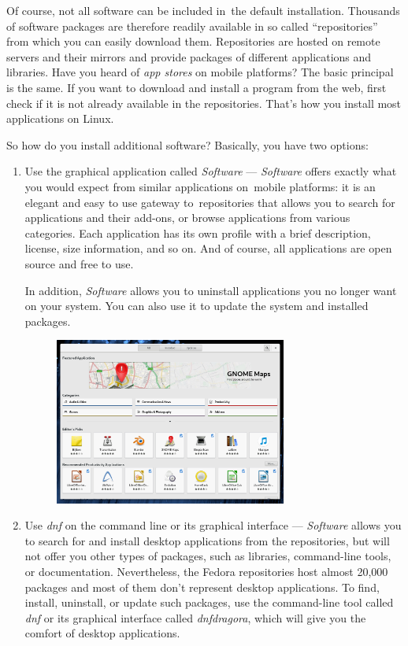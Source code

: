 Of course, not all software can be included in~the default installation. Thousands of software packages are therefore readily available in so called \enquote{repositories} from which you can easily download them. Repositories are hosted on remote servers and their mirrors and provide packages of different applications and libraries. Have you heard of \emph{app stores} on mobile platforms? The basic principal is the same. If you want to download and install a program from the web, first check if it is not already available in the repositories. That's how you install most applications on Linux.


So how do you install additional software? Basically, you have two options:
\begin{enumerate}
\item Use the graphical application called \emph{Software} --- \emph{Software} offers exactly what you would expect from similar applications on~mobile platforms: it is an elegant and easy to use gateway to~repositories that allows you to search for applications and their add-ons, or browse applications from various categories. Each application has its own profile with a brief description, license, size information, and so on. And of course, all applications are open source and free to use.

In addition, \emph{Software} allows you to uninstall applications you no longer want on your system. You can also use it to update the system and installed packages.

\begin{figure}[htbp]
\begin{center}
\includegraphics[width=0.72\textwidth]{img/software}
 \label{fig:software}
\end{center}
\end{figure}

\newpage
\item Use \emph{dnf} on the command line or its graphical interface  --- \emph{Software} allows you to search for and install desktop applications from the repositories, but will not offer you other types of packages, such as libraries, command-line tools, or documentation. Nevertheless, the Fedora repositories host almost 20,000 packages and most of them don't represent desktop applications. To find, install, uninstall, or update such packages, use the command-line tool called \emph{dnf} or its graphical interface called \emph{dnfdragora}, which will give you the comfort of desktop applications.
\end{enumerate}

